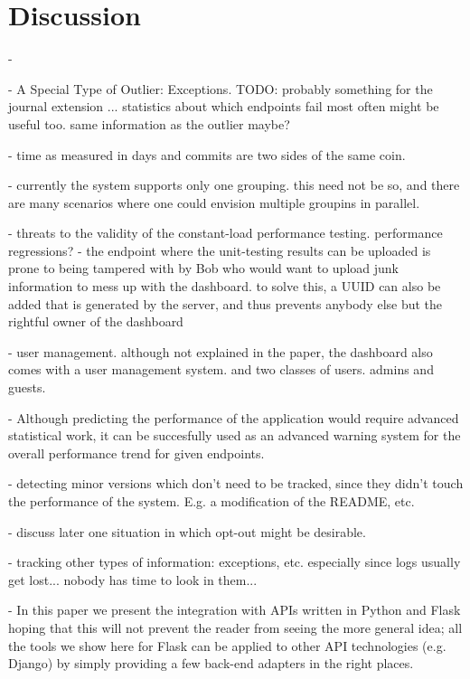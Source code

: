 
\section{Discussion}

-   


- A Special Type of Outlier: Exceptions. TODO: probably something for the journal extension ...
  statistics about which endpoints fail most often might be useful too.
  same information as the outlier maybe?

- time as measured in days and commits are two sides of the same coin. 

- currently the system supports only one grouping. this need not be so, and there are many scenarios where one could envision multiple groupins in parallel.

- threats to the validity of the constant-load performance testing. performance regressions? 
- the endpoint where the unit-testing results can be uploaded is prone to being tampered with by Bob who would want to upload junk information to mess up with the dashboard. to solve this, a UUID can also be added that is generated by the server, and thus prevents anybody else but the rightful owner of the dashboard 

- user management. although not explained in the paper, the dashboard also comes with a user management system. and two classes of users. admins and guests.

- Although predicting the performance of the application would require advanced statistical work, it can be succesfully used as an advanced warning system for the overall performance trend for given endpoints.

- detecting minor versions which don't need to be tracked, since they didn't touch the performance of the system. E.g. a modification of the README, etc. 

- discuss later one situation in which opt-out might be desirable. 

- tracking other types of information: exceptions, etc. especially since logs usually get lost... nobody has time to look in them...

-  In this paper we present the integration with APIs written in Python and Flask hoping that this will not prevent the reader from seeing the more general idea; all the tools we show here for Flask can be applied to other API technologies (e.g. Django) by simply providing a few back-end adapters in the right places.

